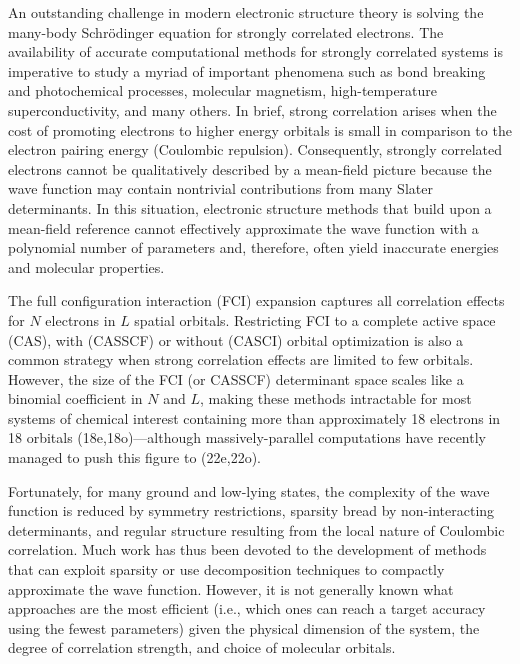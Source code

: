 \documentclass[aip,jcp,amsmath,amssymb, preprint]{revtex4-1}
\begin{document}
An outstanding challenge in modern electronic structure theory is solving the many-body Schr{\"o}dinger equation for strongly correlated electrons.
The availability of accurate computational methods for strongly correlated systems is imperative to study a myriad of important phenomena such as bond breaking and photochemical processes,\cite{Mok1996DynamicalAnd,Roca2012MulticonfigurationSecond} molecular magnetism,\cite{malrieu2014magnetic} high-temperature superconductivity,\cite{Lee2007HighTemp} and many others.\cite{Imada1998MetalInsulator, Salamon2001PhysicsOf, Tokura2006CriticalFeatures, murthy2003hamiltonian}
In brief, strong correlation arises when the cost of promoting electrons to higher energy orbitals is small in comparison to the electron pairing energy (Coulombic repulsion).
Consequently, strongly correlated electrons cannot be qualitatively described by a mean-field picture because the wave function may contain nontrivial contributions from many Slater determinants.\cite{Tew2007ElectronCorrelation, kutzelnigg2003theory}
In this situation, electronic structure methods that build upon a mean-field reference cannot effectively approximate the wave function with a polynomial number of parameters and, therefore, often yield inaccurate energies and molecular properties.

The full configuration interaction (FCI) expansion captures all correlation effects for $N$ electrons in $L$ spatial orbitals.
Restricting FCI to a complete active space (CAS), with (CASSCF)\cite{Roos:1980wj} or without (CASCI) orbital optimization is also a common strategy when strong correlation effects are limited to few orbitals.
However, the size of the FCI (or CASSCF) determinant space scales like a binomial coefficient in $N$ and $L$, making these methods intractable for most systems of chemical interest\cite{Laughlin2000TheTheory} containing more than approximately 18 electrons in 18 orbitals (18e,18o)---although massively-parallel computations have recently managed to push this figure to (22e,22o).\cite{vogiatzis2017pushing}

Fortunately, for many ground and low-lying states, the complexity of the wave function is reduced by symmetry restrictions, sparsity bread by non-interacting determinants, and regular structure resulting from the local nature of Coulombic correlation.
Much work has thus been devoted to the development of methods that can exploit sparsity or use decomposition techniques to compactly approximate the wave function.  
However, it is not generally known what approaches are the most efficient (i.e., which ones can reach a target accuracy using the fewest parameters) given the physical dimension of the system, the degree of correlation strength, and choice of molecular orbitals.
\end{document}
